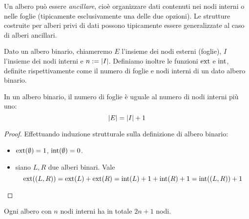 Un albero può essere \emph{ancillare}, cioè organizzare dati contenuti nei nodi interni o nelle foglie (tipicamente esclusivamente una delle due opzioni). Le strutture costruite per alberi privi di dati possono tipicamente essere generalizzate al caso di alberi ancillari.

Dato un albero binario, chiameremo $E$ l'insieme dei nodi esterni (foglie), $I$ l'insieme dei nodi interni e $n:=| I |$.
Definiamo inoltre le funzioni $\mathrm{ext}$ e $\mathrm{int}$, definite rispettivamente come il numero di foglie e nodi interni di un dato albero binario.

\begin{theorem}\label{thm:btree_leaves}
	In un albero binario, il numero di foglie è uguale al numero di nodi interni più uno:
	\begin{equation*}
		| E | = | I | + 1
	\end{equation*}
\end{theorem}
\begin{proof}
	Effettuando induzione strutturale sulla definizione di albero binario:
	\begin{itemize}
		\item $\mathrm{ext}(\emptyset)=1$, $\mathrm{int}(\emptyset)=0$.
		\item siano $L, R$ due alberi binari. Vale
		      \begin{equation*}
			      \mathrm{ext}((L,R)) = \mathrm{ext}(L) + \mathrm{ext}(R) = \mathrm{int}(L) + 1 + \mathrm{int}(R) + 1 = \mathrm{int}((L, R))  + 1
		      \end{equation*}
	\end{itemize}
\end{proof}

\begin{corollario}
	Ogni albero con $n$ nodi interni ha in totale $2n+1$ nodi.
\end{corollario}


